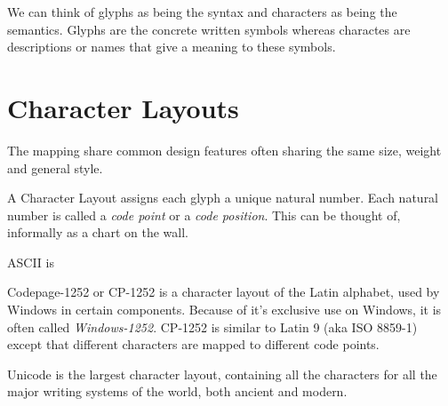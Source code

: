 We can think of glyphs as being the syntax and characters as being the semantics.
Glyphs are the concrete written symbols whereas charactes are descriptions or names 
that give a meaning to these symbols. 









\section{Character Layouts}


The mapping share common design features often sharing 
the same size, weight and general style.



A Character Layout assigns each glyph a unique natural number.
Each natural number is called a \textit{code point} or a \textit{code position}. 
This can be thought of, informally as a chart on the wall. 



\begin{example}
ASCII is 
\end{example}

\frmrule 

\begin{example}
Codepage-1252 or CP-1252 is a character layout of the Latin alphabet, 
used by Windows in certain components. Because of it's exclusive use on Windows, 
it is often called  \textit{Windows-1252}. 
CP-1252 is similar to Latin 9 (aka ISO 8859-1) except that different characters 
are mapped to different code points. 
\end{example}

\frmrule


\begin{example}
Unicode is the largest character layout, containing all the characters for 
all the major writing systems of the world, both ancient 
and modern. 
\end{example}

